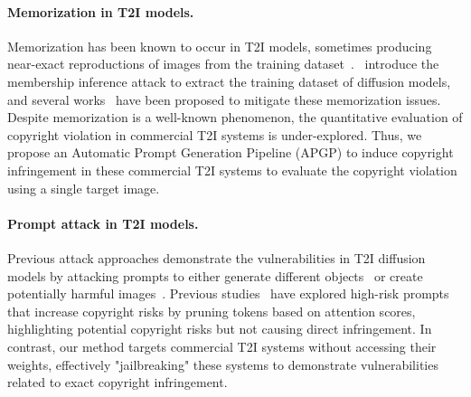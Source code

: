 \vspace{-0.12in}
\paragraph{Memorization in T2I models.}
Memorization has been known to occur in T2I models, sometimes producing near-exact reproductions of images from the training dataset~\citep{somepalli2023understanding}.~\citet{carlini2023extractdm} introduce the membership inference attack to extract the training dataset of diffusion models, and several works~\citep{somepalli2023diffusion, wen2024detecting, wang2024diagnosis} have been proposed to mitigate these memorization issues. Despite memorization is a well-known phenomenon, the quantitative evaluation of copyright violation in commercial T2I systems is under-explored. Thus, we propose an Automatic Prompt Generation Pipeline (APGP) to induce copyright infringement in these commercial T2I systems to evaluate the copyright violation using a single target image.

\vspace{-0.12in}
\paragraph{Prompt attack in T2I models.}
Previous attack approaches demonstrate the vulnerabilities in T2I diffusion models by attacking prompts to either generate different objects~\citep{maus2023black} or create potentially harmful images~\citep{yang2023sneakyprompt, zhai2024discovering}. Previous studies~\citep{zhang2023investigating} have explored high-risk prompts that increase copyright risks by pruning tokens based on attention scores, highlighting potential copyright risks but not causing direct infringement. In contrast, our method targets commercial T2I systems without accessing their weights, effectively "jailbreaking" these systems to demonstrate vulnerabilities related to exact copyright infringement.